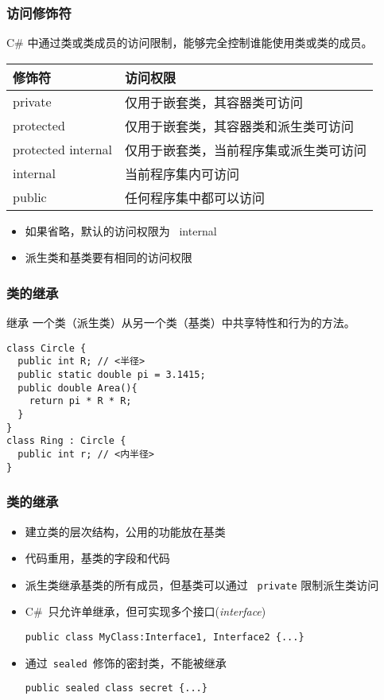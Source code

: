 \begin{frame}
\frametitle{访问修饰符}

{\CJKindent C\# 中通过类或类成员的访问限制，能够完全控制谁能使用类或类的成员。}
\bigskip \pause

\begin{tabular}[tb]{l|l}
  \hline 修饰符      & 访问权限                               \\
  \hline
  private            & 仅用于嵌套类，其容器类可访问           \\
  protected          & 仅用于嵌套类，其容器类和派生类可访问   \\
  protected internal & 仅用于嵌套类，当前程序集或派生类可访问 \\
  internal           & 当前程序集内可访问                     \\
  public             & 任何程序集中都可以访问                 \\
  \hline
\end{tabular}
\bigskip \pause

\begin{itemize}
\item 如果省略，默认的访问权限为 ~internal
\item 派生类和基类要有相同的访问权限
\end{itemize}
\end{frame}

\begin{frame}[fragile]
\frametitle{类的继承}

  \begin{block}{继承}
    \CJKindent 一个类（派生类）从另一个类（基类）中共享特性和行为的方法。
  \end{block}
\pause

\begin{lstlisting}[escapeinside=<>]
class Circle {
  public int R; // <半径>
  public static double pi = 3.1415;
  public double Area(){
    return pi * R * R;
  }
}
class Ring : Circle {
  public int r; // <内半径>
}
\end{lstlisting}
\end{frame}

\begin{frame}[fragile]
\frametitle{类的继承}
  \begin{itemize}
    \setlength{\itemsep}{8pt plus 1pt}
  \item 建立类的层次结构，公用的功能放在基类\pause
  \item 代码重用，基类的字段和代码\pause
  \item 派生类继承基类的所有成员，但基类可以通过 ~\texttt{private} 限制派生类访问\pause
  \item C\#~只允许单继承，但可实现多个接口(\textit{interface})\par
\lstinline|public class MyClass:Interface1, Interface2 {...}|\pause
  \item 通过~\texttt{sealed}~修饰的密封类，不能被继承\par
\lstinline|public sealed class secret {...}|
  \end{itemize}
\end{frame}

